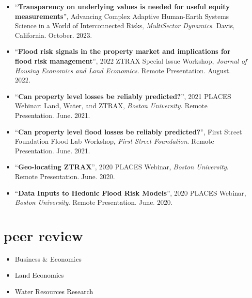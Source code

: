 \documentclass[10pt,oneside]{article}
\begin{document}
\begin{itemize}[label={}]

  \item \enquote{\textbf{Transparency on underlying values is needed for useful equity measurements}}, Advancing Complex Adaptive Human-Earth Systems Science in a World of Interconnected Risks,  \textit{MultiSector Dynamics}. Davis, California.  October. 2023.

  \item \enquote{\textbf{Flood risk signals in the property market and implications for flood risk management}}, 2022 ZTRAX Special Issue Workshop,  \textit{Journal of Housing Economics and Land Economics}. Remote Presentation.  August. 2022.

  \item \enquote{\textbf{Can property level losses be reliably predicted?}}, 2021 PLACES Webinar: Land, Water, and ZTRAX,  \textit{Boston University}. Remote Presentation.  June. 2021.

  \item \enquote{\textbf{Can property level flood losses be reliably predicted?}}, First Street Foundation Flood Lab Workshop,  \textit{First Street Foundation}. Remote Presentation.  June. 2021.

  \item \enquote{\textbf{Geo-locating ZTRAX}}, 2020 PLACES Webinar,  \textit{Boston University}. Remote Presentation.  June. 2020.

  \item \enquote{\textbf{Data Inputs to Hedonic Flood Risk Models}}, 2020 PLACES Webinar,  \textit{Boston University}. Remote Presentation.  June. 2020.

\end{itemize}


\section{peer review}

\mbox{}\vspace{-\dimexpr\baselineskip\relax}

\begin{itemize}[label={}]

    \item Business \& Economics

    \item Land Economics

    \item Water Resources Research

\end{itemize}
\end{document}
